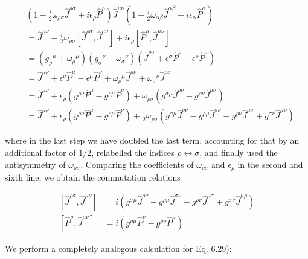 \documentclass[10pt, letterpaper]{article}
\begin{document}
$$
\begin{aligned}
& \left(1-\frac{i}{2} \omega_{\rho \sigma} \hat{J}^{\rho \sigma}+i \epsilon_{\rho} \hat{P}^{\rho}\right) \hat{J}^{\mu \nu}\left(1+\frac{i}{2} \omega_{\alpha \beta} \hat{J}^{\alpha \beta}-i \epsilon_{\alpha} \hat{P}^{\alpha}\right) \\
& =\hat{J}^{\mu \nu}-\frac{i}{2} \omega_{\rho \sigma}\left[\hat{J}^{\rho \sigma}, \hat{J}^{\mu \nu}\right]+i \epsilon_{\rho}\left[\hat{P}^{\rho}, \hat{J}^{\mu \nu}\right] \\
& =\left(g_{\rho}{ }^{\mu}+\omega_{\rho}{ }^{\mu}\right)\left(g_{\sigma}{ }^{\nu}+\omega_{\sigma}{ }^{\nu}\right)\left(\hat{J}^{\rho \sigma}+\epsilon^{\sigma} \hat{P}^{\rho}-\epsilon^{\rho} \hat{P}^{\sigma}\right) \\
& =\hat{J}^{\mu \nu}+\epsilon^{\nu} \hat{P}^{\mu}-\epsilon^{\mu} \hat{P}^{\nu}+\omega_{\rho}{ }^{\mu} \hat{J}^{\rho \nu}+\omega_{\sigma}{ }^{\nu} \hat{J}^{\mu \sigma} \\
& =\hat{J}^{\mu \nu}+\epsilon_{\rho}\left(g^{\rho \nu} \hat{P}^{\mu}-g^{\rho \mu} \hat{P}^{\nu}\right)+\omega_{\rho \sigma}\left(g^{\sigma \mu} \hat{J}^{\rho \nu}-g^{\rho \nu} \hat{J}^{\mu \sigma}\right) \\
& =\hat{J}^{\mu \nu}+\epsilon_{\rho}\left(g^{\rho \nu} \hat{P}^{\mu}-g^{\rho \mu} \hat{P}^{\nu}\right)+\frac{1}{2} \omega_{\rho \sigma}\left(g^{\sigma \mu} \hat{J}^{\rho \nu}-g^{\rho \mu} \hat{J}^{\sigma \nu}-g^{\rho \nu} \hat{J}^{\mu \sigma}+g^{\sigma \nu} \hat{J}^{\mu \rho}\right)
\end{aligned}
$$

where in the last step we have doubled the last term, accounting for that by an additional factor of $1 / 2$, relabelled the indices $\rho \leftrightarrow \sigma$, and finally used the antisymmetry of $\omega_{\rho \sigma}$. Comparing the coefficients of $\omega_{\rho \sigma}$ and $\epsilon_{\rho}$ in the second and sixth line, we obtain the commutation relations

$$
\begin{aligned}
{\left[\hat{J}^{\rho \sigma}, \hat{J}^{\mu \nu}\right] } & =i\left(g^{\sigma \mu} \hat{J}^{\rho \nu}-g^{\rho \mu} \hat{J}^{\sigma \nu}-g^{\rho \nu} \hat{J}^{\mu \sigma}+g^{\sigma \nu} \hat{J}^{\mu \rho}\right) \\
{\left[\hat{P}^{\rho}, \hat{J}^{\mu \nu}\right] } & =i\left(g^{\rho \mu} \hat{P}^{\nu}-g^{\rho \nu} \hat{P}^{\mu}\right)
\end{aligned}
$$

We perform a completely analogous calculation for Eq. 6.29):
\end{document}
